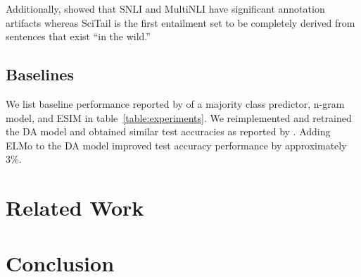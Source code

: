 \documentclass[11pt,a4paper]{article}
\begin{document}
Additionally, \citet{Gururangan2018-lj} showed that SNLI and MultiNLI
have significant annotation artifacts whereas SciTail is the first entailment set to be
completely derived from sentences that exist ``in the wild.''

\subsection{Baselines}

We list baseline performance reported by \citet{Khot2018-th} of a majority class predictor,
n-gram model, and ESIM \citep{Chen2016-wl} in table~\ref{table:experiments}. We reimplemented
and retrained the DA model and obtained similar test accuracies as reported by \citep{Chen2016-wl}.
Adding ELMo to the DA model improved test accuracy performance by approximately 3\%.

\section{Related Work}

\section{Conclusion}



\end{document}
